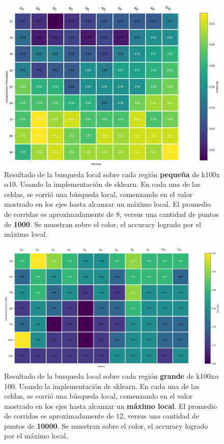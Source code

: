 \begin{figure}[h]
  \includegraphics[width=\textwidth]{./img/parameters-search-small.png}
  \centering
  \caption{Resultado de la busqueda local sobre cada región
    \textbf{pequeña} de k100x$\alpha$10. Usando la implementación de
    sklearn. En cada una de las celdas, se corrió una búsqueda local,
    comenzando en el valor mostrado en los ejes hasta alcanzar un
    máximo local. El promedio de corridas es aproximadamente de 8,
    versus una cantidad de puntos de \textbf{1000}. Se muestran sobre
    el color, el accuracy logrado por el máximo local.}
  \label{fig:param-small}
\end{figure}

\begin{figure}[h]
  \includegraphics[width=\textwidth]{./img/parameters-search-big.png}
  \centering
  \caption{Resultado de la busqueda local sobre cada región
    \textbf{grande} de k100x$\alpha$100. Usando la
    implementación de sklearn. En cada una de las celdas, se corrió
    una búsqueda local, comenzando en el valor mostrado en los ejes
    hasta alcanzar un \textbf{máximo local}. El promedio de corridas
    es aproximadamente de 12, versus una cantidad de puntos de
    \textbf{10000}. Se muestran sobre el color, el accuracy logrado
    por el máximo local.}
    \label{fig:param-big}
\end{figure}

